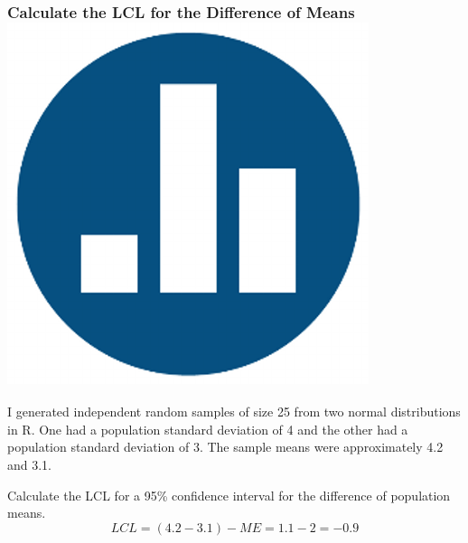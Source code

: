 \begin{frame}
\frametitle{Calculate the LCL for the Difference of Means \hfill \includegraphics[scale = 0.05]{./images/clicker}}
I generated independent random samples of size 25 from two normal distributions in R. One had a population standard deviation of 4 and the other had a population standard deviation of 3. The sample means were approximately 4.2 and 3.1.

\vspace{1em}
\alert{Calculate the LCL for a 95\% confidence interval for the difference of population means.}
\pause
$$LCL = (4.2 - 3.1) - ME = 1.1 - 2 = -0.9$$
\end{frame}

